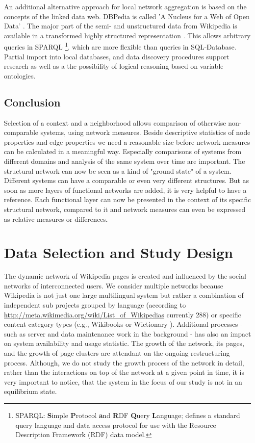 \documentclass[a4paper,10pt]{scrbook}
\begin{document}
An additional alternative approach for local network aggregation is based on the concepts of the linked data web. DBPedia is called 'A Nucleus for a Web of Open Data' \cite{Auer07dbpedia}. The major part of the semi- and unstructured data from Wikipedia is available in a transformed highly structured representation  \cite{isem2013daiber,isem2011mendesetal}. This allows arbitrary queries in SPARQL \footnote{SPARQL: \textbf{S}imple \textbf{P}rotocol \textbf{a}nd \textbf{R}DF \textbf{Q}uery \textbf{L}anguage; defines a standard query language and data access protocol for use with the Resource Description Framework (RDF) data model.}, which are more flexible than queries in SQL-Database. Partial import into local databases, and data discovery procedures support research as well as a the possibility of logical reasoning based on variable ontologies. 
 
 
\section*{Conclusion}

Selection of a context and a neighborhood allows comparison of otherwise non-comparable systems, using network measures. Beside descriptive statistics of node properties and edge properties we need a reasonable size before network measures can be calculated in a meaningful way. Especially comparisons of systems from different domains and analysis of the same system over time are important. The structural network can now be seen as a kind of "ground state" of a system. Different systems can have a comparable or even very different structures. But as soon as more layers of functional networks are added, it is very helpful to have a reference. Each functional layer can now be presented in the context of its specific structural network, compared to it and network measures can even be expressed as relative measures or differences.   


\chapter{Data Selection and Study Design}

The dynamic network of Wikipedia pages is created and influenced by the social networks of interconnected users. We consider multiple networks because Wikipedia is not just one large multilingual system but rather a combination of independent sub projects grouped by language (according to \url{http://meta.wikimedia.org/wiki/List_of_Wikipedias} currently 288) or specific content category types (e.g., Wikibooks \cite{WIKIBOOKS} or Wictionary \cite{WIKTIONARY}). Additional processes - such as server and data maintenance work in the background - has also an impact on system availability and usage statistic. The growth of the network, its pages, and the growth of page clusters are attendant on the ongoing restructuring process. Although, we do not study the growth process of the network in detail, rather than the interactions on top of the network at a given point in time, it is very important to notice, that the system in the focus of our study is not in an equilibrium state. 
\end{document}

